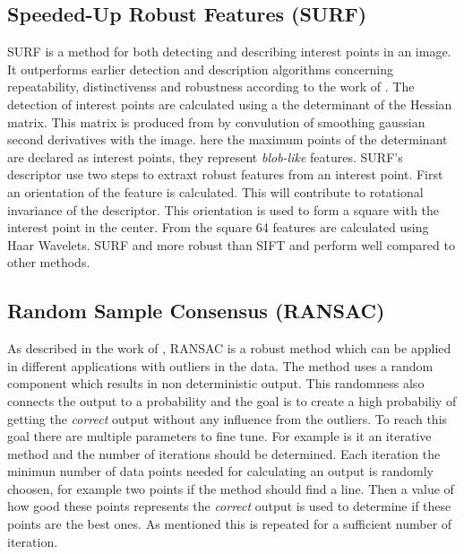 \subsection{Speeded-Up Robust Features (SURF)}
SURF is a method for both detecting and describing interest points in an image. It outperforms earlier detection and description algorithms concerning repeatability, distinctivenss and robustness according to the work of \cite{SURF}. The detection of interest points are calculated using a the determinant of the Hessian matrix. This matrix is produced from by convulution of smoothing gaussian second derivatives with the image. here the maximum points of the determinant are declared as interest points, they represent {\it blob-like} features. SURF's descriptor use two steps to extraxt robust features from an interest point. First an orientation of the feature is calculated. This will contribute to rotational invariance of the descriptor. This orientation is used to form a square with the interest point in the center. From the square 64 features are calculated using Haar Wavelets. SURF and more robust than SIFT and perform well compared to other methods.

\subsection{Random Sample Consensus (RANSAC)}
As described in the work of \cite{RANSAC}, RANSAC is a robust method which can be applied in different applications with outliers in the data. The method uses a random component which results in non deterministic output. This randomness also connects the output to a probability and the goal is to create a high probabiliy of getting the {\it correct} output without any influence from the outliers. To reach this goal there are multiple parameters to fine tune. For example is it an iterative method and the number of iterations should be determined. Each iteration the minimun number of data points needed for calculating an output is randomly choosen, for example two points if the method should find a line. Then a value of how good these points represents the {\it correct} output is used to determine if these points are the best ones. As mentioned this is repeated for a sufficient number of iteration.

